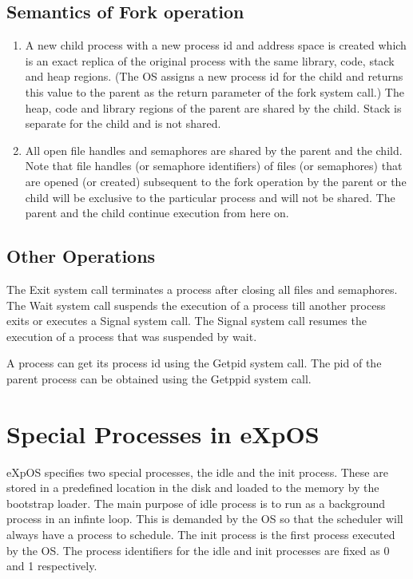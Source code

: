 \subsection{Semantics of Fork operation}
\begin{enumerate}
\item A new child process with a new process id and address space is created which is an exact replica of the original process with the same library, code, stack and heap regions. (The OS assigns a new process id for the child and returns this value to the parent as the return parameter of the fork system call.) The heap, code and library regions of the parent are shared by the child. Stack is separate for the child and is not shared.
\item All open file handles and semaphores are shared by the parent and the child. Note that file handles (or semaphore identifiers) of files (or semaphores) that are opened (or created) subsequent to the fork operation by the parent or the child will be exclusive to the particular process and will not be shared. The parent and the child continue execution from here on.
\end{enumerate}

\subsection{Other Operations}
The Exit system call terminates a process after closing all files and semaphores. The Wait system call suspends the execution of a process till another process exits or executes a Signal system call. The Signal system call resumes the execution of a process that was suspended by wait.

A process can get its process id using the Getpid system call. The pid of the parent process can be obtained using the Getppid system call.

\section{Special Processes in eXpOS}
eXpOS specifies two special processes, the idle and the init process. These are stored in a predefined location in the disk and loaded to the memory by the bootstrap loader. The main purpose of idle process is to run as a background process in an infinte loop. This is demanded by the OS so that the scheduler will always have a process to schedule. The init process is the first process executed by the OS. The process identifiers for the idle and init processes are fixed as 0 and 1 respectively.


